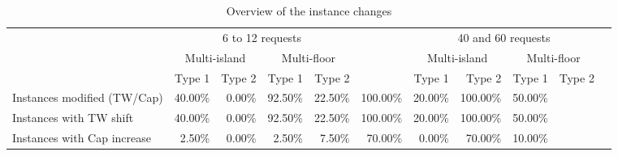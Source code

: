 \begin{table}[!ht]
    \centering
    \caption{Overview of the instance changes}
    \label{tab:inst_change_overview}
    \scriptsize
    \begin{tabular}{lr rrrr r rrrr}\toprule
        \multirow{3}{*}{} &\multicolumn{4}{c}{6 to 12 requests} & &\multicolumn{4}{c}{40 and 60 requests} \\
        \cmidrule{2-9}
        &\multicolumn{2}{c}{Multi-island} &\multicolumn{2}{c}{Multi-floor} & &\multicolumn{2}{c}{Multi-island} &\multicolumn{2}{c}{Multi-floor} \\
        \cmidrule{2-9}
        &Type 1 &Type 2 &Type 1 &Type 2 & &Type 1 &Type 2 &Type 1 &Type 2 \\
        \midrule
        Instances modified (TW/Cap) &40.00\% & 0.00\% & 92.50\% & 22.50\% & 100.00\% & 20.00\% & 100.00\% & 50.00\% \\
        Instances with TW shift &40.00\% & 0.00\% & 92.50\% & 22.50\% & 100.00\% & 20.00\% & 100.00\% & 50.00\% \\
        Instances with Cap increase &2.50\% & 0.00\% & 2.50\% & 7.50\% & 70.00\% & 0.00\% & 70.00\% & 10.00\% \\
        \bottomrule
\end{tabular}
\end{table}
